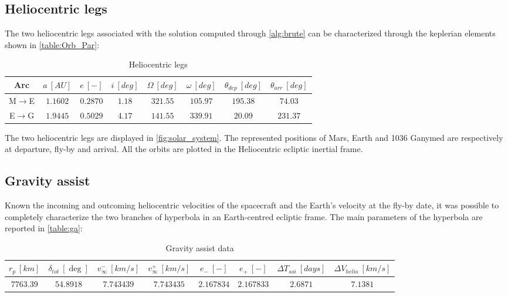 \subsection{Heliocentric legs}
\label{subsec:heliocentric}
The two heliocentric legs associated with the solution computed through \autoref{alg:brute} can be characterized through the keplerian elements shown in \autoref{table:Orb_Par}:
\begin{table}[H]

    \centering
    \begin{tabular}{|c|c|c|c|c|c|c|c|}
    \hline
    Arc &  $a  \ [AU]$ & $e \ [-]$ & $i \ [deg]$ & $\Omega \ [deg]$ & $\omega \ [deg]$ & $\theta_{dep} \ [deg]$ & $\theta_{arr} \ [deg]$ \\
    \hline
    M$\to$E &  $1.1602$ & $0.2870$ & $1.18$ & $321.55$ & $105.97$ & $195.38$ & $74.03$ \\
    \hline
    E$\to$G & $1.9445$ & $0.5029$ & $4.17$ & $141.55$ & $339.91$ & $20.09$ & $231.37$ \\
    \hline
    \end{tabular}
    
    \caption{Heliocentric legs}
    \label{table:Orb_Par} 
\end{table}


The two heliocentric legs are displayed in \autoref{fig:solar_system}. The represented positions of Mars, Earth and 1036 Ganymed are respectively at departure, fly-by and arrival. All the orbits are plotted in the Heliocentric ecliptic inertial frame.
\subsection{Gravity assist}
\label{subsec:ga}

Known the incoming and outcoming heliocentric velocities of the spacecraft and the Earth's velocity at the fly-by date, it was possible to completely characterize the two branches of hyperbola in an Earth-centred ecliptic frame. The main parameters of the hyperbola are reported in \autoref{table:ga}:

\begin{table}[H]

    \centering
    \begin{tabular}{|c|c|c|c|c|c|c|c|}
    \hline
    $r_p \ [km]$ &  $\delta _{tot} \ [\deg]$ & $v_{\infty}^{-} \ [km/s]$ & $v_{\infty}^{+} \ [km/s]$ & $e_{-} \ [-]$ & $e_{+} \ [-]$ & $\Delta T_{soi} \ [days]$ & $\Delta V_{helio} \ [km/s]$ \\
    \hline
    $7763.39$ &  $54.8918$ & $7.743439$ & $7.743435$ & $2.167834$ & $2.167833$ & $2.6871$ & $7.1381$ \\
    \hline
    \end{tabular}
    
    \caption{Gravity assist data}
    \label{table:ga} 
\end{table}

